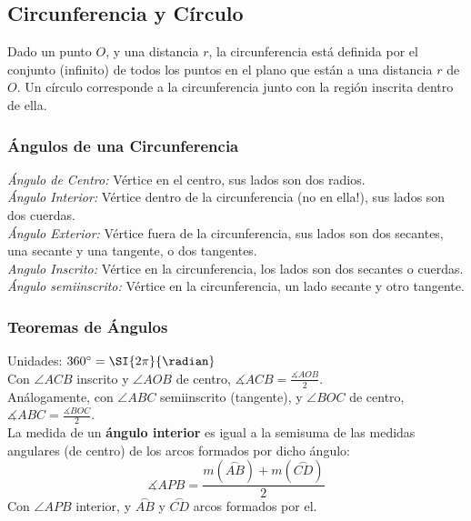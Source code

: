 \subsection{Circunferencia y Círculo}
Dado un punto $O$, y una distancia $r$, la circunferencia está definida por el conjunto (infinito) de todos los puntos en el plano que están a una distancia $r$ de $O$. Un círculo corresponde a la circunferencia junto con la región inscrita dentro de ella.\\

\subsubsection{Ángulos de una Circunferencia}
\textit{Ángulo de Centro:} Vértice en el centro, sus lados son dos radios.\\
\textit{Ángulo Interior:} Vértice dentro de la circunferencia (no en ella!), sus lados son dos cuerdas.\\
\textit{Ángulo Exterior:} Vértice fuera de la circunferencia, sus lados son dos secantes, una secante y una tangente, o dos tangentes.\\
\textit{Angulo Inscrito:} Vértice en la circunferencia, los lados son dos secantes o cuerdas.\\
\textit{Ángulo semiinscrito:} Vértice en la circunferencia, un lado secante y otro tangente.\\

\subsubsection{Teoremas de Ángulos}
Unidades: $360^{\circ} = \SI{2\pi}{\radian}$\\

Con $\angle ACB$ inscrito y $\angle AOB$ de centro,
$\measuredangle ACB = \frac{\measuredangle AOB}{2}$.\\

Análogamente, con $\angle ABC$ semiinscrito (tangente), y $\angle BOC$ de centro, $\measuredangle ABC = \frac{\measuredangle BOC}{2}$.\\

La medida de un \textbf{ángulo interior} es igual a la semisuma de las medidas angulares (de centro) de los arcos formados por dicho ángulo:
\begin{equation*}
    \measuredangle APB = \frac{m(\stackrel\frown{AB}) + m(\stackrel\frown{CD})}{2}
\end{equation*}
Con $\angle APB$ interior, y $\stackrel\frown{AB}$ y $\stackrel\frown{CD}$ arcos formados por el.\\

